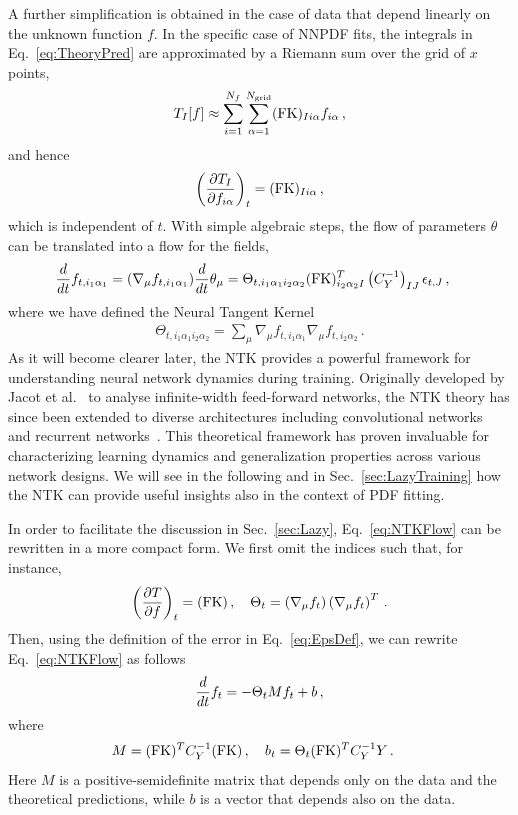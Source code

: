 A further simplification is obtained in the case of data that depend linearly on
the unknown function $f$. In the specific case of NNPDF fits, the integrals in
Eq.~\eqref{eq:TheoryPred} are approximated by a Riemann sum over the grid of $x$
points,
\begin{align}
    \label{eq:FKTabDef}
    T_I[f] \approx \sum_{i=1}^{N_{f}}\sum_{\alpha=1}^{N_{\mathrm{grid}}} (\mathrm{FK})_{Ii\alpha} f_{i\alpha}\, ,
\end{align}
and hence
\begin{align}
    \label{eq:dTbydf}
    \left(\frac{\partial T_I}{\partial f_{i\alpha}}\right)_t =
        (\mathrm{FK})_{Ii\alpha}\, ,
\end{align}
which is independent of $t$. With simple algebraic steps, the flow of parameters
$\theta$ can be translated into a flow for the fields,
\begin{align}
    \label{eq:NTKFlow}
    \frac{d}{dt} &f_{t,i_1\alpha_1} = (\nabla_\mu f_{t,i_1\alpha_1}) \frac{d}{dt} \theta_\mu =
      \Theta_{t,i_1\alpha_1i_2\alpha_2}
      (\mathrm{FK})^T_{i_2\alpha_2I} \left(C_Y^{-1}\right)_{IJ} \epsilon_{t,J}\, ,
\end{align}
where we have defined the Neural Tangent Kernel~\cite{jacot2018neural}
\begin{align}
    \label{eq:NTKDef}
    \Theta_{t,i_1\alpha_1i_2\alpha_2} = \sum_\mu
    \nabla_\mu f_{t,i_1\alpha_1} \nabla_\mu f_{t,i_2\alpha_2}\, .
\end{align}
As it will become clearer later, the NTK provides a powerful framework for
understanding neural network dynamics during training. Originally developed by
Jacot et al.~\cite{jacot2018neural} to analyse infinite-width feed-forward
networks, the NTK theory has since been extended to diverse architectures
including convolutional networks~\cite{arora2019exact} and recurrent
networks~\cite{alemohammad2021recurrent}. This theoretical framework has proven
invaluable for characterizing learning dynamics and generalization properties
across various network designs. We will see in the following and in
Sec.~\ref{sec:LazyTraining} how the NTK can provide useful insights also in the
context of PDF fitting.

In order to facilitate the discussion in Sec.~\ref{sec:Lazy},
Eq.~\eqref{eq:NTKFlow} can be rewritten in a more compact form. We first omit
the indices such that, for instance,
\begin{align}
  \left(\frac{\partial T}{\partial f}\right)_t = (\mathrm{FK})\, , \quad
  \Theta_t = \left(\nabla_\mu f_t\right) \left(\nabla_\mu f_t\right)^T\, .
  \label{eq:dTdfForLinearObs}
\end{align}
Then, using the definition of the error in Eq.~\eqref{eq:EpsDef}, we can rewrite
Eq.~\eqref{eq:NTKFlow} as follows
\begin{align}
    \label{eq:FlowEquationNoIndices}
    \frac{d}{dt} f_t = -\Theta_t M f_t + b\, ,
\end{align}
where
\begin{align}
    M &= (\mathrm{FK})^T C_Y^{-1} (\mathrm{FK})\, , \quad b_t = \Theta_t (\mathrm{FK})^T C_Y^{-1} Y\, .
    \label{eq:MandBDef}
\end{align}
Here $M$ is a positive-semidefinite matrix that depends only on the data and the
theoretical predictions, while $b$ is a vector that depends also on the data.


